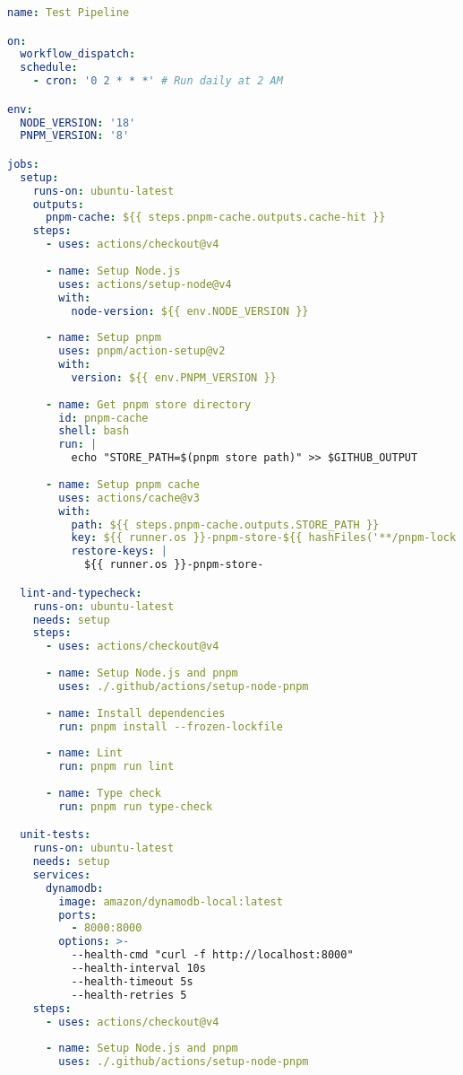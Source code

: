 \begin{lstlisting}[language=YAML, caption=.github/workflows/test-pipeline.yml]
name: Test Pipeline

on:
  workflow_dispatch:
  schedule:
    - cron: '0 2 * * *' # Run daily at 2 AM

env:
  NODE_VERSION: '18'
  PNPM_VERSION: '8'

jobs:
  setup:
    runs-on: ubuntu-latest
    outputs:
      pnpm-cache: ${{ steps.pnpm-cache.outputs.cache-hit }}
    steps:
      - uses: actions/checkout@v4
      
      - name: Setup Node.js
        uses: actions/setup-node@v4
        with:
          node-version: ${{ env.NODE_VERSION }}
          
      - name: Setup pnpm
        uses: pnpm/action-setup@v2
        with:
          version: ${{ env.PNPM_VERSION }}
          
      - name: Get pnpm store directory
        id: pnpm-cache
        shell: bash
        run: |
          echo "STORE_PATH=$(pnpm store path)" >> $GITHUB_OUTPUT
          
      - name: Setup pnpm cache
        uses: actions/cache@v3
        with:
          path: ${{ steps.pnpm-cache.outputs.STORE_PATH }}
          key: ${{ runner.os }}-pnpm-store-${{ hashFiles('**/pnpm-lock.yaml') }}
          restore-keys: |
            ${{ runner.os }}-pnpm-store-

  lint-and-typecheck:
    runs-on: ubuntu-latest
    needs: setup
    steps:
      - uses: actions/checkout@v4
      
      - name: Setup Node.js and pnpm
        uses: ./.github/actions/setup-node-pnpm
        
      - name: Install dependencies
        run: pnpm install --frozen-lockfile
        
      - name: Lint
        run: pnpm run lint
        
      - name: Type check
        run: pnpm run type-check

  unit-tests:
    runs-on: ubuntu-latest
    needs: setup
    services:
      dynamodb:
        image: amazon/dynamodb-local:latest
        ports:
          - 8000:8000
        options: >-
          --health-cmd "curl -f http://localhost:8000"
          --health-interval 10s
          --health-timeout 5s
          --health-retries 5
    steps:
      - uses: actions/checkout@v4
      
      - name: Setup Node.js and pnpm
        uses: ./.github/actions/setup-node-pnpm
        

\end{lstlisting}
